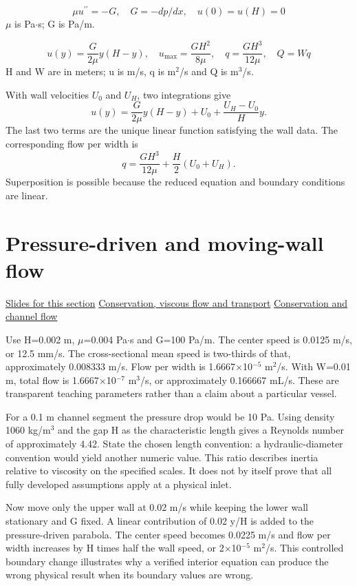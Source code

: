 \documentclass[11pt,letterpaper]{article}
\theoremstyle{definition}\newtheorem{definition}{Definition}\newtheorem{example}{Example}
\numberwithin{equation}{section}
\begin{document}
\[
\mu u^{\prime\prime}=-G,\quad G=-dp/dx,\quad u(0)=u(H)=0
\]
\ensuremath{\mu} is Pa\ensuremath{\cdot}s; G is Pa/m.

\[
u(y)=\frac{G}{2\mu}y(H-y),\quad u_{\max}=\frac{GH^2}{8\mu},\quad q=\frac{GH^3}{12\mu},\quad Q=Wq
\]
H and W are in meters; u is m/s, q is m\ensuremath{^{2}}/s and Q is m\ensuremath{^{3}}/s.

With wall velocities $U_0$ and $U_H$, two integrations give
\[
 u(y)=\frac{G}{2\mu}y(H-y)+U_0+\frac{U_H-U_0}{H}y.
\]
The last two terms are the unique linear function satisfying the wall data. The corresponding flow per width is
\[
 q=\frac{GH^3}{12\mu}+\frac H2(U_0+U_H).
\]
Superposition is possible because the reduced equation and boundary conditions are linear.
\section{Pressure-driven and moving-wall flow}
\hypertarget{note-pressure-driven-and-moving-wall-flow}{}\label{note:pressure-driven-and-moving-wall-flow}
{\small \href{slides.html\#frame=flux-and-maximum-speed\&step=1}{Slides for this section} \quad \href{../modules/cfd/index.html}{Conservation, viscous flow and transport} \quad \href{../modules/animations/conservation-flow.html}{Conservation and channel flow}}\par
Use H=0.002 m, \ensuremath{\mu}=0.004 Pa\ensuremath{\cdot}s and G=100 Pa/m. The center speed is 0.0125 m/s, or 12.5 mm/s. The cross-sectional mean speed is two-thirds of that, approximately 0.008333 m/s. Flow per width is 1.6667\ensuremath{\times}10\ensuremath{^{-5}} m\ensuremath{^{2}}/s. With W=0.01 m, total flow is 1.6667\ensuremath{\times}10\ensuremath{^{-7}} m\ensuremath{^{3}}/s, or approximately 0.166667 mL/s. These are transparent teaching parameters rather than a claim about a particular vessel.

For a 0.1 m channel segment the pressure drop would be 10 Pa. Using density 1060 kg/m\ensuremath{^{3}} and the gap H as the characteristic length gives a Reynolds number of approximately 4.42. State the chosen length convention: a hydraulic-diameter convention would yield another numeric value. This ratio describes inertia relative to viscosity on the specified scales. It does not by itself prove that all fully developed assumptions apply at a physical inlet.

Now move only the upper wall at 0.02 m/s while keeping the lower wall stationary and G fixed. A linear contribution of 0.02 y/H is added to the pressure-driven parabola. The center speed becomes 0.0225 m/s and flow per width increases by H times half the wall speed, or 2\ensuremath{\times}10\ensuremath{^{-5}} m\ensuremath{^{2}}/s. This controlled boundary change illustrates why a verified interior equation can produce the wrong physical result when its boundary values are wrong.
\end{document}
